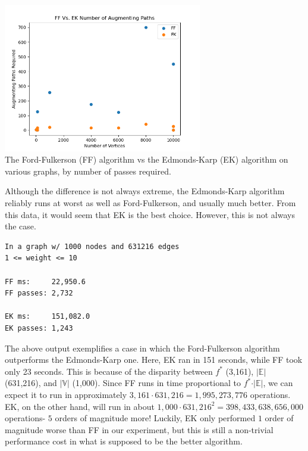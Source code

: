 \documentclass[12pt]{amsart}
\begin{document}
\begin{center}
    \includegraphics[width=0.65\textwidth]
        {mf_passes_comparison.png} \\
    The Ford-Fulkerson (FF) algorithm vs the Edmonds-Karp (EK)
    algorithm on various graphs, by number of passes required.
    \\
    \vskip 1cm
\end{center}

    Although the difference is not always extreme, the
    Edmonds-Karp algorithm reliably runs at worst as well as
    Ford-Fulkerson, and usually much better. From this data, it
    would seem that EK is the best choice. However, this is not
    always the case.

\begin{verbatim}
In a graph w/ 1000 nodes and 631216 edges
1 <= weight <= 10

FF ms:     22,950.6
FF passes: 2,732

EK ms:     151,082.0
EK passes: 1,243

\end{verbatim}

    The above output exemplifies a case in which the
    Ford-Fulkerson algorithm outperforms the Edmonds-Karp one.
    Here, EK ran in 151 seconds, while FF took only 23 seconds.
    This is because of the disparity between $f^*$ (3,161),
    $\vert \mathbb{E} \vert$ (631,216), and
    $\vert \mathbb{V} \vert$ (1,000). Since FF runs in time
    proportional to $f^* \cdot \vert \mathbb{E} \vert$, we can
    expect it to run in approximately
    $3,161 \cdot 631,216 = 1,995,273,776$ operations. EK, on the
    other hand, will run in about
    $1,000 \cdot 631,216^2 = 398,433,638,656,000$ operations-
    $5$ orders of magnitude more! Luckily, EK only performed $1$
    order of magnitude worse than FF in our experiment, but this
    is still a non-trivial performance cost in what is supposed
    to be the better algorithm.
\end{document}
